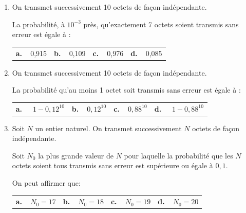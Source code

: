 \begin{enumerate}[resume]
\item On transmet successivement 10 octets de façon indépendante.

La probabilité, à $10^{-3}$ près, qu'exactement 7 octets soient transmis sans erreur est égale à :

\begin{center}
\begin{tabularx}{\linewidth}{*{4}{X}}
\textbf{a.~~}0,915 &\textbf{b.~~}0,109 &\textbf{c.~~}0,976 &\textbf{d.~~}0,085
\end{tabularx}
\end{center}
\item On transmet successivement 10 octets de façon indépendante.

La probabilité qu'au moins 1 octet soit transmis sans erreur est égale à :

\begin{center}
\begin{tabularx}{\linewidth}{*{4}{X}}
\textbf{a.~~} $1 - 0,12^{10}$ &\textbf{b.~~}$0,12^{10}$ &\textbf{c.~~}$0,88^{10}$ &\textbf{d.~~} $1- 0,88^{10}$
\end{tabularx}
\end{center}
\item Soit $N$ un entier naturel. On transmet successivement $N$ octets de façon indépendante. 

Soit $N_0$ la plus grande valeur de $N$ pour laquelle la probabilité que les $N$ octets soient tous transmis sans erreur est supérieure ou égale à $0,1$.

On peut affirmer que:

\begin{center}
\begin{tabularx}{\linewidth}{*{4}{X}}
\textbf{a.~~}$N_0 = 17$ &\textbf{b.~~}$N_0 = 18$ &\textbf{c.~~}$N_0 = 19$ &\textbf{d.~~}$N_0 = 20$
\end{tabularx}
\end{center}
\end{enumerate}
